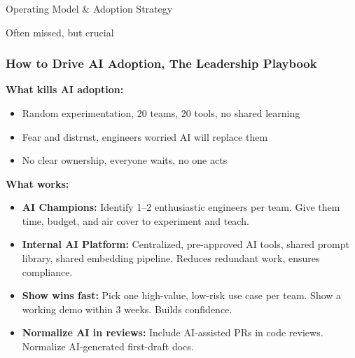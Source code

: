 \begin{frame}[fragile]\frametitle{}
\begin{center}
{\Large Operating Model \& Adoption Strategy}

{\small Often missed, but crucial}
\end{center}
\end{frame}

\begin{frame}[fragile]\frametitle{How to Drive AI Adoption, The Leadership Playbook}
\textbf{What kills AI adoption:}
\begin{itemize}
\item Random experimentation, 20 teams, 20 tools, no shared learning
\item Fear and distrust, engineers worried AI will replace them
\item No clear ownership, everyone waits, no one acts
\end{itemize}

\textbf{What works:}
\begin{itemize}
\item \textbf{AI Champions:} Identify 1--2 enthusiastic engineers per team. Give them time, budget, and air cover to experiment and teach.
\item \textbf{Internal AI Platform:} Centralized, pre-approved AI tools, shared prompt library, shared embedding pipeline. Reduces redundant work, ensures compliance.
\item \textbf{Show wins fast:} Pick one high-value, low-risk use case per team. Show a working demo within 3 weeks. Builds confidence.
\item \textbf{Normalize AI in reviews:} Include AI-assisted PRs in code reviews. Normalize AI-generated first-draft docs.
\end{itemize}
\end{frame}

